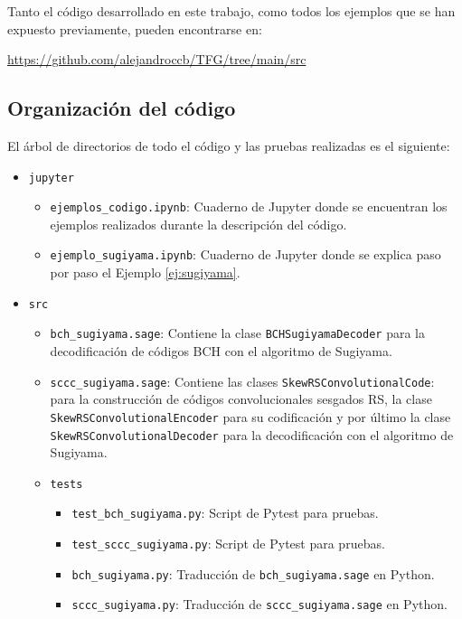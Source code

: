 Tanto el código desarrollado en este trabajo, como todos los ejemplos que se han expuesto previamente, pueden encontrarse en:

\begin{center}
    \href{https://github.com/alejandroccb/TFG/tree/main/src}{https://github.com/alejandroccb/TFG/tree/main/src}
\end{center}

\subsection{Organización del código}

El árbol de directorios de todo el código y las pruebas realizadas es el siguiente:
    \begin{itemize}
        \item[] \texttt{jupyter}
        \begin{itemize}
            \item[] \texttt{ejemplos\_codigo.ipynb}: Cuaderno de Jupyter donde se encuentran los ejemplos realizados durante la descripción del código.
            \item[] \texttt{ejemplo\_sugiyama.ipynb}: Cuaderno de Jupyter donde se explica paso por paso el Ejemplo \ref{ej:sugiyama}.
        \end{itemize}
        \item[] \texttt{src}
        \begin{itemize}
            \item[] \texttt{bch\_sugiyama.sage}: Contiene la clase \texttt{BCHSugiyamaDecoder} para la decodificación de códigos BCH con el algoritmo de Sugiyama.
            \item[] \texttt{sccc\_sugiyama.sage}: Contiene las clases \texttt{SkewRSConvolutionalCode}: para la construcción de códigos convolucionales sesgados RS, la clase \texttt{SkewRSConvolutionalEncoder} para su codificación y por último la clase \texttt{SkewRSConvolutionalDecoder} para la decodificación con el algoritmo de Sugiyama.
            \item[] \texttt{tests}
            \begin{itemize}
                \item[] \texttt{test\_bch\_sugiyama.py}: Script de Pytest para pruebas.
                \item[] \texttt{test\_sccc\_sugiyama.py}: Script de Pytest para pruebas.
                \item[] \texttt{bch\_sugiyama.py}: Traducción de \texttt{bch\_sugiyama.sage} en Python.
                \item[] \texttt{sccc\_sugiyama.py}: Traducción de \texttt{sccc\_sugiyama.sage} en Python.
            \end{itemize}
        \end{itemize}
    \end{itemize}

